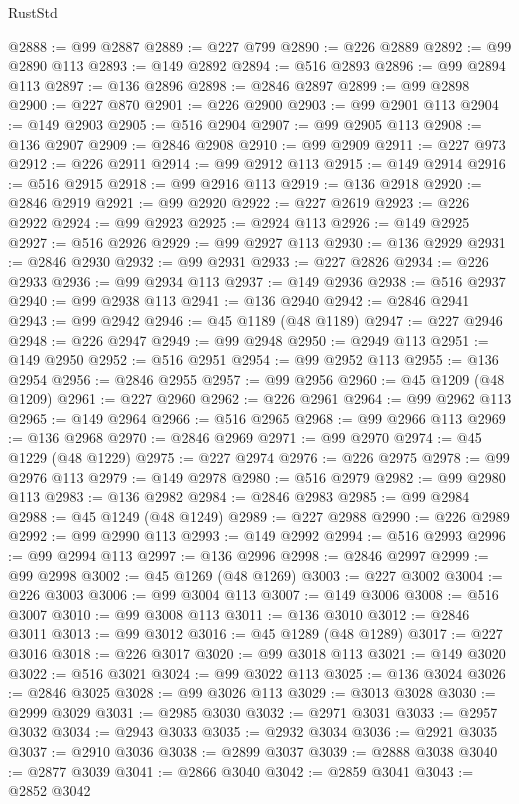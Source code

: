 \begin{lexlean}{RustStd}
\begin{coremodule}
@2888 := @99 @2887
@2889 := @227 @799
@2890 := @226 @2889
@2892 := @99 @2890 @113
@2893 := @149 @2892
@2894 := @516 @2893
@2896 := @99 @2894 @113
@2897 := @136 @2896
@2898 := @2846 @2897
@2899 := @99 @2898
@2900 := @227 @870
@2901 := @226 @2900
@2903 := @99 @2901 @113
@2904 := @149 @2903
@2905 := @516 @2904
@2907 := @99 @2905 @113
@2908 := @136 @2907
@2909 := @2846 @2908
@2910 := @99 @2909
@2911 := @227 @973
@2912 := @226 @2911
@2914 := @99 @2912 @113
@2915 := @149 @2914
@2916 := @516 @2915
@2918 := @99 @2916 @113
@2919 := @136 @2918
@2920 := @2846 @2919
@2921 := @99 @2920
@2922 := @227 @2619
@2923 := @226 @2922
@2924 := @99 @2923
@2925 := @2924 @113
@2926 := @149 @2925
@2927 := @516 @2926
@2929 := @99 @2927 @113
@2930 := @136 @2929
@2931 := @2846 @2930
@2932 := @99 @2931
@2933 := @227 @2826
@2934 := @226 @2933
@2936 := @99 @2934 @113
@2937 := @149 @2936
@2938 := @516 @2937
@2940 := @99 @2938 @113
@2941 := @136 @2940
@2942 := @2846 @2941
@2943 := @99 @2942
@2946 := @45 @1189 (@48 @1189)
@2947 := @227 @2946
@2948 := @226 @2947
@2949 := @99 @2948
@2950 := @2949 @113
@2951 := @149 @2950
@2952 := @516 @2951
@2954 := @99 @2952 @113
@2955 := @136 @2954
@2956 := @2846 @2955
@2957 := @99 @2956
@2960 := @45 @1209 (@48 @1209)
@2961 := @227 @2960
@2962 := @226 @2961
@2964 := @99 @2962 @113
@2965 := @149 @2964
@2966 := @516 @2965
@2968 := @99 @2966 @113
@2969 := @136 @2968
@2970 := @2846 @2969
@2971 := @99 @2970
@2974 := @45 @1229 (@48 @1229)
@2975 := @227 @2974
@2976 := @226 @2975
@2978 := @99 @2976 @113
@2979 := @149 @2978
@2980 := @516 @2979
@2982 := @99 @2980 @113
@2983 := @136 @2982
@2984 := @2846 @2983
@2985 := @99 @2984
@2988 := @45 @1249 (@48 @1249)
@2989 := @227 @2988
@2990 := @226 @2989
@2992 := @99 @2990 @113
@2993 := @149 @2992
@2994 := @516 @2993
@2996 := @99 @2994 @113
@2997 := @136 @2996
@2998 := @2846 @2997
@2999 := @99 @2998
@3002 := @45 @1269 (@48 @1269)
@3003 := @227 @3002
@3004 := @226 @3003
@3006 := @99 @3004 @113
@3007 := @149 @3006
@3008 := @516 @3007
@3010 := @99 @3008 @113
@3011 := @136 @3010
@3012 := @2846 @3011
@3013 := @99 @3012
@3016 := @45 @1289 (@48 @1289)
@3017 := @227 @3016
@3018 := @226 @3017
@3020 := @99 @3018 @113
@3021 := @149 @3020
@3022 := @516 @3021
@3024 := @99 @3022 @113
@3025 := @136 @3024
@3026 := @2846 @3025
@3028 := @99 @3026 @113
@3029 := @3013 @3028
@3030 := @2999 @3029
@3031 := @2985 @3030
@3032 := @2971 @3031
@3033 := @2957 @3032
@3034 := @2943 @3033
@3035 := @2932 @3034
@3036 := @2921 @3035
@3037 := @2910 @3036
@3038 := @2899 @3037
@3039 := @2888 @3038
@3040 := @2877 @3039
@3041 := @2866 @3040
@3042 := @2859 @3041
@3043 := @2852 @3042

\end{coremodule}
\end{lexlean}
